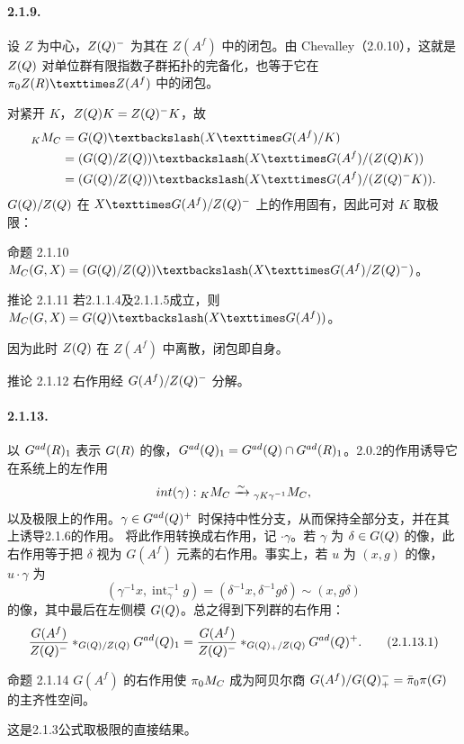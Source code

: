 \paragraph*{2.1.9.} 设 $Z$ 为中心，$Z(Q)^-$ 为其在 $Z(A^f)$ 中的闭包。由 Chevalley（2.0.10），这就是 $Z(Q)$ 对单位群有限指数子群拓扑的完备化，也等于它在 $\pi_0Z(\R)\times Z(A^f)$ 中的闭包。

对紧开 $K$，$Z(Q)K=Z(Q)^-K$，故
\[
 \begin{split}
 {}_KM_{\C}
 &=G(\Q)\backslash(X\times G(A^f)/K)\\
 &=(G(\Q)/Z(\Q))\backslash(X\times G(A^f)/(Z(\Q)K))\\
 &=(G(\Q)/Z(\Q))\backslash(X\times G(A^f)/(Z(\Q)^-K)).
 \end{split}
\]
$G(Q)/Z(Q)$ 在 $X\times G(A^f)/Z(\Q)^-$ 上的作用固有，因此可对 $K$ 取极限：
\begin{originaltheorem}{命题 2.1.10}
$M_{\C}(G,X)=(G(\Q)/Z(\Q))\backslash(X\times G(A^f)/Z(\Q)^-)$。
\end{originaltheorem}
\begin{originaltheorem}{推论 2.1.11}
若2.1.1.4及2.1.1.5成立，则 $M_{\C}(G,X)=G(\Q)\backslash(X\times G(A^f))$。
\end{originaltheorem}
因为此时 $Z(Q)$ 在 $Z(A^f)$ 中离散，闭包即自身。
\begin{originaltheorem}{推论 2.1.12}
右作用经 $G(A^f)/Z(Q)^-$ 分解。
\end{originaltheorem}
\paragraph*{2.1.13.} 以 $G^{ad}(R)_1$ 表示 $G(R)$ 的像，$G^{ad}(Q)_1=G^{ad}(Q)\cap G^{ad}(R)_1$。2.0.2的作用诱导它在系统上的左作用
\[
 int(\gamma):{}_KM_{C}\xrightarrow{\sim}{}_{\gamma K\gamma^{-1}}M_{C},
\]
以及极限上的作用。$\gamma\in G^{ad}(Q)^+$ 时保持中性分支，从而保持全部分支，并在其上诱导2.1.6的作用。
将此作用转换成右作用，记 $\cdot\gamma$。若 $\gamma$ 为 $\delta\in G(Q)$ 的像，此右作用等于把 $\delta$ 视为 $G(A^f)$ 元素的右作用。事实上，若 $u$ 为 $(x,g)$ 的像，$u\cdot\gamma$ 为
\[
 (\gamma^{-1}x,\operatorname{int}_\gamma^{-1}g)
 =(\delta^{-1}x,\delta^{-1}g\delta)\sim(x,g\delta)
\]
的像，其中最后在左侧模 $G(Q)$。总之得到下列群的右作用：
\begin{equation}
 \frac{G(A^f)}{Z(Q)^-}*_{G(Q)/Z(Q)}G^{ad}(Q)_1
 =\frac{G(A^f)}{Z(Q)^-}*_{G(Q)_+/Z(Q)}G^{ad}(Q)^+.
 \tag{2.1.13.1}
\end{equation}
\begin{originaltheorem}{命题 2.1.14}
$G(A^f)$ 的右作用使 $\pi_0M_{C}$ 成为阿贝尔商 $G(A^f)/G(Q)_+^-\allowbreak=\bar\pi_0\pi(G)$ 的主齐性空间。
\end{originaltheorem}
这是2.1.3公式取极限的直接结果。
